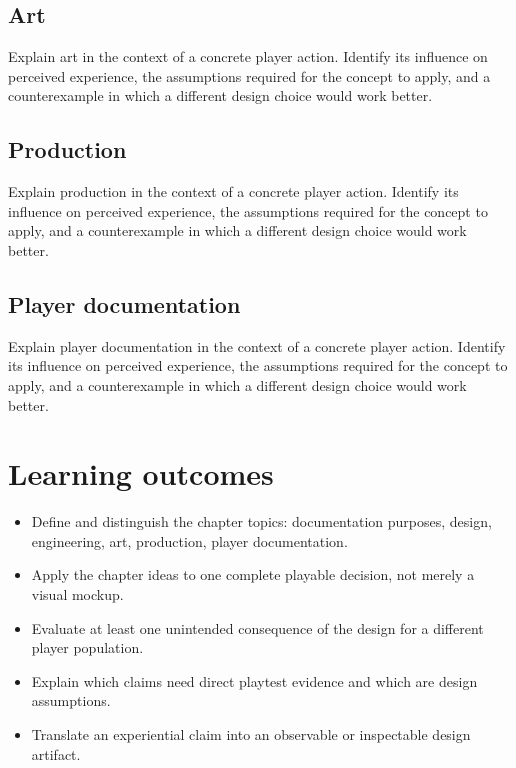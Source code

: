 \documentclass[11pt]{article}
\begin{document}
\subsection{Art}
Explain art in the context of a concrete player action. Identify its influence on perceived experience, the assumptions required for the concept to apply, and a counterexample in which a different design choice would work better.


\subsection{Production}
Explain production in the context of a concrete player action. Identify its influence on perceived experience, the assumptions required for the concept to apply, and a counterexample in which a different design choice would work better.


\subsection{Player documentation}
Explain player documentation in the context of a concrete player action. Identify its influence on perceived experience, the assumptions required for the concept to apply, and a counterexample in which a different design choice would work better.


\section{Learning outcomes}
\begin{itemize}
\item Define and distinguish the chapter topics: documentation purposes, design, engineering, art, production, player documentation.
\item Apply the chapter ideas to one complete playable decision, not merely a visual mockup.
\item Evaluate at least one unintended consequence of the design for a different player population.
\item Explain which claims need direct playtest evidence and which are design assumptions.
\item Translate an experiential claim into an observable or inspectable design artifact.
\end{itemize}
\end{document}
